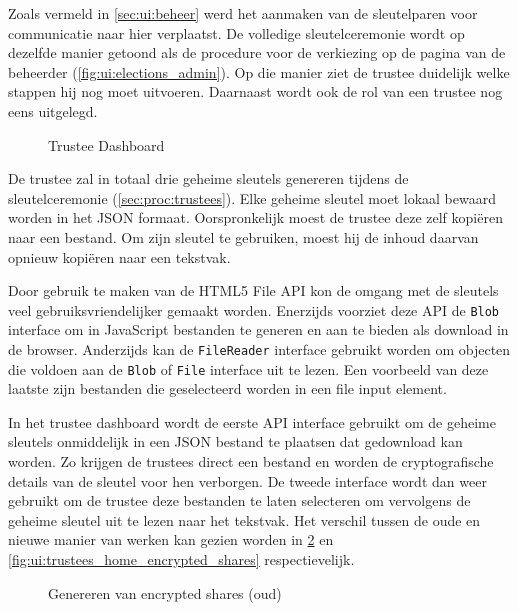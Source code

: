 \npar Zoals vermeld in \ref{sec:ui:beheer} werd het aanmaken van de sleutelparen voor communicatie naar hier verplaatst. De volledige sleutelceremonie wordt op dezelfde manier getoond als de procedure voor de verkiezing op de pagina van de beheerder (\ref{fig:ui:elections_admin}). Op die manier ziet de trustee duidelijk welke stappen hij nog moet uitvoeren. Daarnaast wordt ook de rol van een trustee nog eens uitgelegd.

\begin{figure}
  \caption{Trustee Dashboard}
  \label{fig:ui:trustees_home}
\end{figure}

\npar De trustee zal in totaal drie geheime sleutels genereren tijdens de sleutelceremonie (\ref{sec:proc:trustees}). Elke geheime sleutel moet lokaal bewaard worden in het JSON formaat. Oorspronkelijk moest de trustee deze zelf kopi\"eren naar een bestand. Om zijn sleutel te gebruiken, moest hij de inhoud daarvan opnieuw kopi\"eren naar een tekstvak.

\npar Door gebruik te maken van de HTML5 File API kon de omgang met de sleutels veel gebruiksvriendelijker gemaakt worden.\cite{ranganathan_sicking_file_api} Enerzijds voorziet deze API de \texttt{Blob} interface om in JavaScript bestanden te generen en aan te bieden als download in de browser. Anderzijds kan de \texttt{FileReader} interface gebruikt worden om objecten die voldoen aan de \texttt{Blob} of \texttt{File} interface uit te lezen. Een voorbeeld van deze laatste zijn bestanden die geselecteerd worden in een file input element.

\npar In het trustee dashboard wordt de eerste API interface gebruikt om de geheime sleutels onmiddelijk in een JSON bestand te plaatsen dat gedownload kan worden. Zo krijgen de trustees direct een bestand en worden de cryptografische details van de sleutel voor hen verborgen. De tweede interface wordt dan weer gebruikt om de trustee deze bestanden te laten selecteren om vervolgens de geheime sleutel uit te lezen naar het tekstvak. Het verschil tussen de oude en nieuwe manier van werken kan gezien worden in \ref{fig:ui:trustees_home_encrypted_shares_old} en \ref{fig:ui:trustees_home_encrypted_shares} respectievelijk.

\begin{figure}
  \caption{Genereren van encrypted shares (oud)}
  \label{fig:ui:trustees_home_encrypted_shares_old}
\end{figure}

